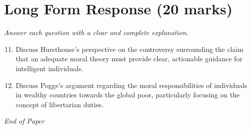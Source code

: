 \documentclass[12pt]{article}
\begin{document}
\section*{Long Form Response (20 marks)}
\textit{Answer each question with a clear and complete explanation.}
\begin{enumerate}[label=\arabic*.]
\setcounter{enumi}{10}
\item Discuss Hursthouse's perspective on the controversy surrounding the claim that an adequate moral theory must provide clear, actionable guidance for intelligent individuals.
\item Discuss Pogge's argument regarding the moral responsibilities of individuals in wealthy countries towards the global poor, particularly focusing on the concept of libertarian duties.
\end{enumerate}

\vfill
\noindent\textit{End of Paper}
\end{document}
